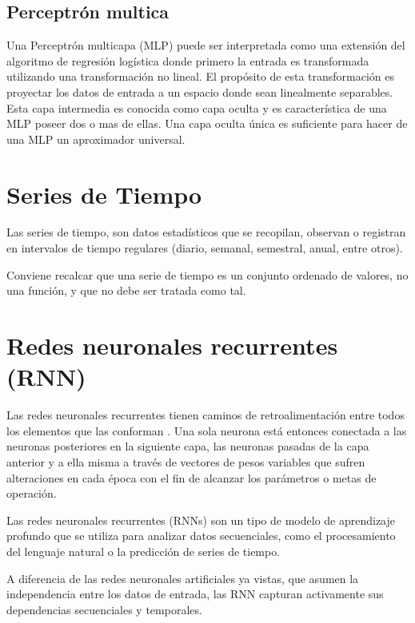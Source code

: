 \subsection{Perceptrón multica}
Una Perceptrón multicapa (MLP) puede ser interpretada como una extensión del algoritmo de regresión logística donde primero la entrada es transformada utilizando una transformación no lineal\cite{de2014aprendizaje}. El propósito de esta transformación es proyectar los datos de entrada a un espacio donde sean linealmente separables.
Esta capa intermedia es conocida como capa oculta y es característica de una MLP poseer dos o mas de ellas. Una capa oculta única es suficiente para hacer de una MLP un aproximador universal.

\section{Series de Tiempo}
Las series de tiempo, son datos estadísticos que se recopilan, observan o registran en intervalos de tiempo regulares (diario, semanal, semestral, anual, entre otros)\cite{herrera2020prediccion}. 

Conviene recalcar que una serie de tiempo es un conjunto ordenado de valores, no una función, y que no debe ser tratada como tal\cite{nava2015procesamiento}.

\section{Redes neuronales recurrentes (RNN)}

Las redes neuronales recurrentes tienen caminos de retroalimentación entre todos los elementos que las conforman \cite{montesdeoca2016estudios}. Una sola neurona está entonces conectada a las neuronas posteriores en la siguiente capa, las neuronas pasadas de la capa anterior y a ella misma a través de vectores de pesos variables que sufren alteraciones en cada época con el fin de alcanzar los parámetros o metas de operación.

Las redes neuronales recurrentes (RNNs) son un tipo de modelo de aprendizaje profundo que se utiliza para analizar datos secuenciales, como el procesamiento del lenguaje natural o la predicción de series de tiempo\cite{tomas2023prediccion}.

A diferencia de las redes neuronales artificiales ya vistas, que asumen la independencia entre los datos de entrada, las RNN capturan activamente sus dependencias secuenciales y temporales\cite{arana2021redes}.

